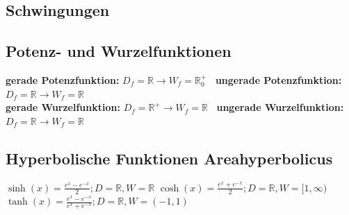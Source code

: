\begin{flushleft}
		\subsection{Schwingungen}

		\subsection{Potenz- und Wurzelfunktionen}
			\textbf{gerade Potenzfunktion:} $D_f=\mathbb{R} \rightarrow W_f=\mathbb{R}^+_0\;\;$
			\textbf{ungerade Potenzfunktion:} $D_f=\mathbb{R} \rightarrow W_f=\mathbb{R}$\\		
			\textbf{gerade Wurzelfunktion:} $D_f=\mathbb{R}^+ \rightarrow W_f=\mathbb{R}\;\;$
			\textbf{ungerade Wurzelfunktion:} $D_f=\mathbb{R} \rightarrow W_f=\mathbb{R}$
		
		\subsection{Hyperbolische Funktionen Areahyperbolicus}
			$	\sinh(x)=\frac{e^x-e^{-x}}{2}; D=\mathbb{R}, W=\mathbb{R} $
			\hspace{1.2cm}
			$ \cosh(x)=\frac{e^x+e^{-x}}{2}; D=\mathbb{R}, W=[1,\infty ) $
			\hspace{1.2cm}
			$ \tanh(x)=\frac{e^x-e^{-x}}{e^x+e^{-x}}; D=\mathbb{R}, W=(-1,1)  $
		

\end{flushleft}
